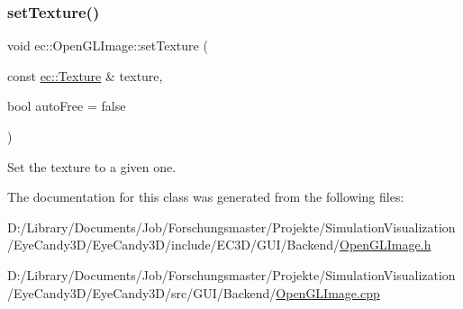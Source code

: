 \subsubsection{\texorpdfstring{set\+Texture()}{setTexture()}}
{\footnotesize\ttfamily void ec\+::\+Open\+G\+L\+Image\+::set\+Texture (\begin{DoxyParamCaption}\item[{const \mbox{\hyperlink{classec_1_1_texture}{ec\+::\+Texture}} \&}]{texture,  }\item[{bool}]{auto\+Free = {\ttfamily false} }\end{DoxyParamCaption})}

Set the texture to a given one. 

The documentation for this class was generated from the following files\+:\begin{DoxyCompactItemize}
\item 
D\+:/\+Library/\+Documents/\+Job/\+Forschungsmaster/\+Projekte/\+Simulation\+Visualization/\+Eye\+Candy3\+D/\+Eye\+Candy3\+D/include/\+E\+C3\+D/\+G\+U\+I/\+Backend/\mbox{\hyperlink{_open_g_l_image_8h}{Open\+G\+L\+Image.\+h}}\item 
D\+:/\+Library/\+Documents/\+Job/\+Forschungsmaster/\+Projekte/\+Simulation\+Visualization/\+Eye\+Candy3\+D/\+Eye\+Candy3\+D/src/\+G\+U\+I/\+Backend/\mbox{\hyperlink{_open_g_l_image_8cpp}{Open\+G\+L\+Image.\+cpp}}\end{DoxyCompactItemize}
